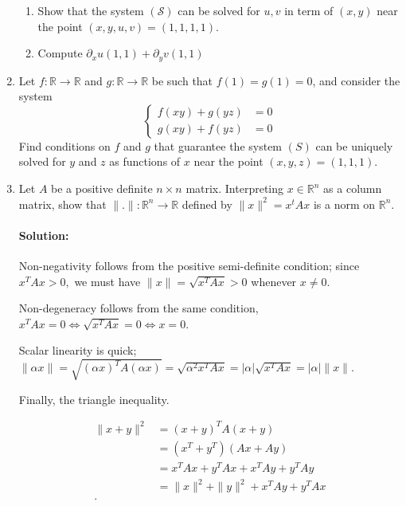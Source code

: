 \documentclass{article}
\begin{document}
\begin{enumerate}
\begin{enumerate}[label= (\alph*)] 
\item Show that the system $(\mathcal{S})$ can be solved for $u,v$ in term of $(x,y)$ near the point $(x,y,u,v)=(1,1,1,1)$.

\item Compute $\partial_x u(1,1)+\partial_y v(1,1)$
\end{enumerate}

\item Let $f:\mathbb{R}\to\mathbb{R}$ and $g:\mathbb{R}\to\mathbb{R}$ be such that $f(1)=g(1)=0$, and consider the system \begin{equation*}
\begin{cases}
f(xy)+g(yz) & = 0 \\
g(xy)+f(yz) & = 0
\end{cases}
\end{equation*}
Find conditions on $f$ and $g$ that guarantee the system $(S)$ can be uniquely solved for $y$ and $z$ as functions of $x$ near the point $(x,y,z)=(1,1,1)$.

\item Let $A$ be a positive definite $n\times n$ matrix. Interpreting $x\in\mathbb{R}^n$ as a column matrix, show that $\|.\|:\mathbb{R}^n\to\mathbb{R}$ defined by $\|x\|^2=x^tAx$ is a norm on $\mathbb{R}^n.$

    \paragraph{Solution: } %
    Non-negativity follows from the positive semi-definite condition; since $x^{T}Ax>0,$ we must have $\|x\|=\sqrt{x^{T}Ax} >0$ whenever $x\neq 0$.

    Non-degeneracy follows from the same condition, $x^{T}Ax=0\iff \sqrt{x^{T}Ax} =0\iff x=0$.

    Scalar linearity is quick; $\|\alpha x\|=\sqrt{(\alpha x)^{T}A(\alpha x)}=\sqrt{\alpha^2 x^{T}Ax} =|\alpha|\sqrt{x^{T}Ax} =|\alpha|\|x\| $.

    Finally, the triangle inequality. 

    \begin{align*}
        \|x+y\|^2&= (x+y)^{T}A(x+y)\\
                 &=(x^{T}+y^{T})(Ax+Ay) \\
                 &= x^{T}Ax+y^{T}Ax+x^{T}Ay+y^{T}Ay \\
                 &= \|x\|^2+\|y\|^2+x^{T}Ay+y^{T}Ax \\
    .\end{align*}
\fi

\end{enumerate}
\end{document}
